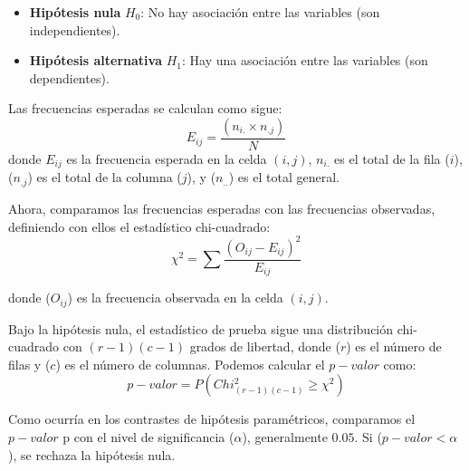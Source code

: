 \documentclass[
  letterpaper,
  DIV=11,
  numbers=noendperiod]{scrreprt}
\providecommand{\tightlist}{%
  \setlength{\itemsep}{0pt}\setlength{\parskip}{0pt}}\usepackage{longtable,booktabs,array}
\begin{document}
\begin{itemize}
\tightlist
\item
  \textbf{Hipótesis nula} \(H_0\): No hay asociación entre las variables
  (son independientes).
\item
  \textbf{Hipótesis alternativa} \(H_1\): Hay una asociación entre las
  variables (son dependientes).
\end{itemize}

Las frecuencias esperadas se calculan como sigue: \[
   E_{ij} = \frac{(n_{i.} \times n_{.j})}{N}
   \] donde \(E_{ij}\) es la frecuencia esperada en la celda \((i,j)\),
\(n_{i.}\) es el total de la fila (\(i\)), (\(n_{.j}\)) es el total de
la columna (\(j\)), y (\(n_{..}\)) es el total general.

Ahora, comparamos las frecuencias esperadas con las frecuencias
observadas, definiendo con ellos el estadístico chi-cuadrado: \[
\chi^2 = \sum \frac{(O_{ij} - E_{ij})^2}{E_{ij}} 
\]

donde (\(O_{ij}\)) es la frecuencia observada en la celda \((i,j)\).

Bajo la hipótesis nula, el estadístico de prueba sigue una distribución
chi-cuadrado con \((r-1)(c-1)\) grados de libertad, donde (\(r\)) es el
número de filas y (\(c\)) es el número de columnas. Podemos calcular el
\(p-valor\) como: \[
p-valor=P(Chi^2_{(r-1)(c-1)}\geq\chi^2)
\]

Como ocurría en los contrastes de hipótesis paramétricos, comparamos el
\(p-valor\) p con el nivel de significancia (\(\alpha\)), generalmente
\(0.05\). Si (\(p-valor < \alpha\)), se rechaza la hipótesis nula.
\end{document}
